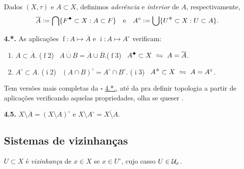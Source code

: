 \begin{definition}
    Dados \((X,\tau)\) e \(A\subset X\), definimos \emph{aderência} e \emph{interior} de \(A\), respectivamente, 
    \[\overline{A}:= \bigcap \{F\ce \subset X : A \subset F \} \text{ \ \ e \ \ } A^\circ := \bigcup \{U\ab \subset X : U \subset A\}.\]  
\end{definition}
\vspace{-0.2cm}
\hypertarget{prop4x}{}
\begin{proposition}
    \textbf{4.*.} As aplicações \(\operatorname{f}:  A \mapsto \overline{A}   \) e \(\operatorname{i} : A \mapsto A^\circ\) verificam: 
    \vspace{-0.2cm}
    \begin{enumerate}[label = (\(\operatorname{f}\)\arabic*), left = 0.75cm]
        \item \(A\subset \overline{A}\). \hfill (\(\operatorname{f}\)2) \ \(\overline{A\cup B} = \overline{A} \cup \overline{B}\).\hfill (\(\operatorname{f}\)3) \ \(A\ce\subset X \ \leftrightharpoons \ A = \overline{A}\)\hspace{0.1cm}.
        \item[(\(\operatorname{i}\)1)] \(A^\circ \subset A\). \hspace{1.65cm} (\(\operatorname{i}\)2) \ \((A \cap B)^\circ = A^\circ \cap B^\circ\).\hspace{1.1cm} (\(\operatorname{i}\)3) \ \(A\ab \subset X \ \leftrightharpoons \ A = A^\circ\).
    \end{enumerate}
\end{proposition}
\begin{note}
    Tem versões mais completas da \(\square\) \hyperlink{prop4x}{4.*.}, até da pra definir topologia a partir de aplicações verificando aquelas propriedades, olha se queser \cite[pag. 9]{mujica2005}.  
\end{note}
\begin{proposition}
    \textbf{4.5.} \(X\setminus \overline{A} = (X \setminus A)^\circ\) e \( X\setminus A^\circ = \overline{X\setminus A}\). 
\end{proposition}

\subsection*{Sistemas de vizinhanças}

\begin{definition}
    \(U\subset X\) é \emph{vizinhança} de \(x \in X\) se \(x \in U^\circ\), cujo casso \( U \in \mathcal{U}_x\). 
\end{definition}

